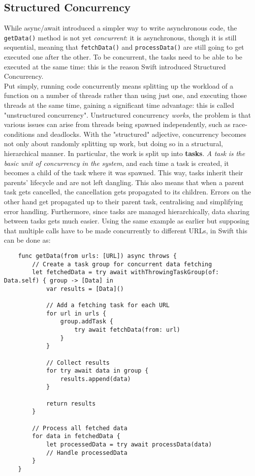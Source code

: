 \subsection{Structured Concurrency}
While async/await introduced a simpler way to write asynchronous code, the \lstinline{getData()} method is not yet \textit{concurrent}: it is asynchronous, though it is still sequential, meaning that \lstinline{fetchData()} and \lstinline{processData()} are still going to get executed one after the other. To be concurrent, the tasks need to be able to be executed at the same time: this is the reason Swift introduced Structured Concurrency. \\
Put simply, running code concurrently means splitting up the workload of a function on a number of threads rather than using just one, and executing those threads at the same time, gaining a significant time advantage: this is called "unstructured concurrency". Unstructured concurrency \textit{works}, the problem is that various issues can arise from threads being spawned independently, such as \gls{race-condition}s and \gls{deadlock}s. 
With the "structured" adjective, concurrency becomes not only about randomly splitting up work, but doing so in a structural, hierarchical manner. In particular, the work is split up into \textbf{tasks}. \textit{A task is the basic unit of concurrency in the system}\cite{structured-concurrency-proposal}, and each time a task is created, it becomes a child of the task where it was spawned. This way, tasks inherit their parents' lifecycle and are not left dangling. This also means that when a parent task gets cancelled, the cancellation gets propagated to its children. Errors on the other hand get propagated up to their parent task, centralising and simplifying error handling. Furthermore, since tasks are managed hierarchically, data sharing between tasks gets much easier. \cite{structured-concurrency-proposal}
Using the same example as earlier but supposing that multiple calls have to be made concurrently to different URLs, in Swift this can be done as:
\begin{verbatim}
    func getData(from urls: [URL]) async throws {
        // Create a task group for concurrent data fetching
        let fetchedData = try await withThrowingTaskGroup(of: Data.self) { group -> [Data] in
            var results = [Data]()

            // Add a fetching task for each URL
            for url in urls {
                group.addTask {
                    try await fetchData(from: url)
                }
            }

            // Collect results
            for try await data in group {
                results.append(data)
            }

            return results
        }

        // Process all fetched data
        for data in fetchedData {
            let processedData = try await processData(data)
            // Handle processedData
        }
    }
\end{verbatim}
